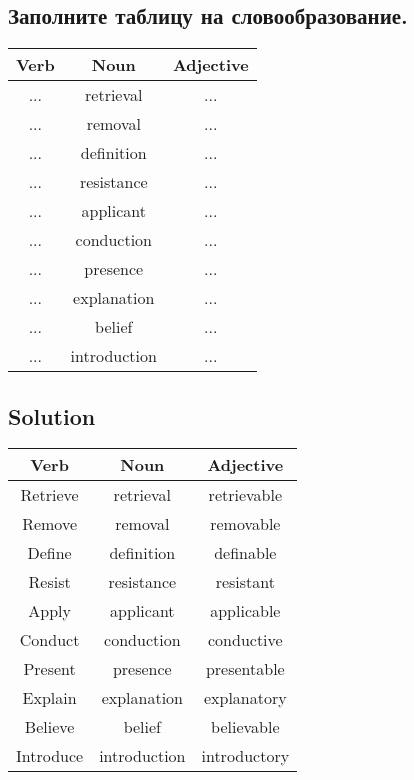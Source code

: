 \subsection*{Заполните таблицу на словообразование.}
\begin{center}
      \begin{tabular}{|c|c|c|}
            \hline
            Verb & Noun         & Adjective \\
            \hline
            ...  & retrieval    & ...       \\
            ...  & removal      & ...       \\
            ...  & definition   & ...       \\
            ...  & resistance   & ...       \\
            ...  & applicant    & ...       \\
            ...  & conduction   & ...       \\
            ...  & presence     & ...       \\
            ...  & explanation  & ...       \\
            ...  & belief       & ...       \\
            ...  & introduction & ...       \\
            \hline
      \end{tabular}
\end{center}

\subsection*{Solution}
\begin{center}
      \begin{tabular}{|c|c|c|}
            \hline
            Verb      & Noun         & Adjective    \\
            \hline
            Retrieve  & retrieval    & retrievable  \\
            Remove    & removal      & removable    \\
            Define    & definition   & definable    \\
            Resist    & resistance   & resistant    \\
            Apply     & applicant    & applicable   \\
            Conduct   & conduction   & conductive   \\
            Present   & presence     & presentable  \\
            Explain   & explanation  & explanatory  \\
            Believe   & belief       & believable   \\
            Introduce & introduction & introductory \\
            \hline
      \end{tabular}
\end{center}

